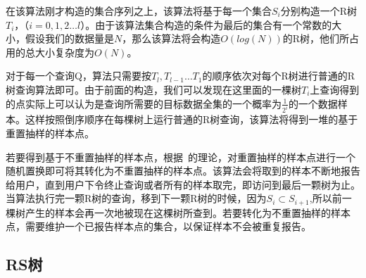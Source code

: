 在该算法刚才构造的集合序列之上，该算法将基于每一个集合$ S_{i} $分别构造一个R树$ T_{i} $，（$ i = 0,1,2 \dots l $）。由于该算法集合构造的条件为最后的集合有一个常数的大小，假设我们的数据量是$ N $，那么该算法将会构造$ O(log(N)) $的R树，他们所占用的总大小复杂度为$ O(N) $。

对于每一个查询Q，算法只需要按$ T_{l},T_{l-1} \dots T_{1} $的顺序依次对每个R树进行普通的R树查询算法即可。由于前面的构造，我们可以发现在这里面的一棵树$ T_{i} $上查询得到的点实际上可以认为是查询所需要的目标数据全集的一个概率为$ \frac{1}{2^i} $的一个数据样本。这样按照倒序顺序在每棵树上运行普通的R树查询，该算法将得到一堆的基于重置抽样的样本点。

若要得到基于不重置抽样的样本点，根据~\cite{RS07}的理论，对重置抽样的样本点进行一个随机置换即可将其转化为不重置抽样的样本点。该算法会将取到的样本不断地报告给用户，直到用户下令终止查询或者所有的样本取完，即访问到最后一颗树为止。当算法执行完一颗R树的查询，移到下一颗R树的时候，因为$ S_{i} \subset S_{i+1} $,所以前一棵树产生的样本会再一次地被现在这棵树所查到。若要转化为不重置抽样的样本点，需要维护一个已报告样本点的集合，以保证样本不会被重复报告。

\subsection{RS树}
















